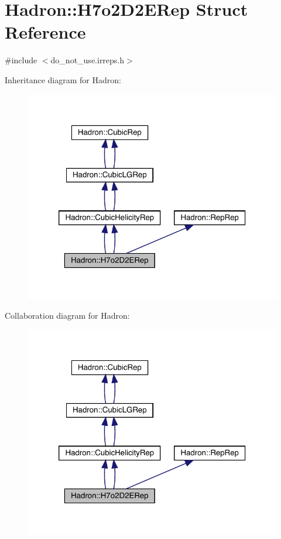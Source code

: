 \hypertarget{structHadron_1_1H7o2D2ERep}{}\section{Hadron\+:\+:H7o2\+D2\+E\+Rep Struct Reference}
\label{structHadron_1_1H7o2D2ERep}


{\ttfamily \#include $<$do\+\_\+not\+\_\+use.\+irreps.\+h$>$}



Inheritance diagram for Hadron\+:\nopagebreak
\begin{figure}[H]
\begin{center}
\leavevmode
\includegraphics[width=320pt]{df/df8/structHadron_1_1H7o2D2ERep__inherit__graph}
\end{center}
\end{figure}


Collaboration diagram for Hadron\+:\nopagebreak
\begin{figure}[H]
\begin{center}
\leavevmode
\includegraphics[width=320pt]{d4/d1f/structHadron_1_1H7o2D2ERep__coll__graph}
\end{center}
\end{figure}
